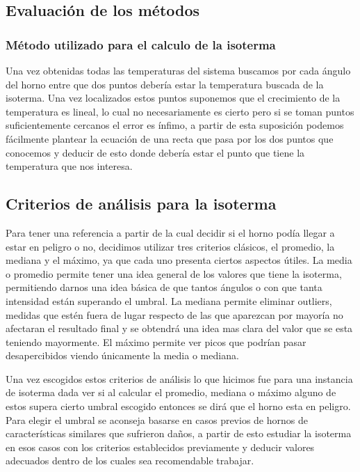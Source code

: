 \subsection{Evaluación de los métodos}

\subsubsection{Método utilizado para el calculo de la isoterma}

Una vez obtenidas todas las temperaturas del sistema buscamos por cada ángulo del horno entre que dos puntos debería estar la temperatura buscada de la isoterma. Una vez localizados estos puntos suponemos que el crecimiento de la temperatura es lineal, lo cual no necesariamente es cierto pero si se toman puntos suficientemente cercanos el error es ínfimo, a partir de esta suposición podemos fácilmente plantear la ecuación de una recta que pasa por los dos puntos que conocemos y deducir de esto donde debería estar el punto que tiene la temperatura que nos interesa.

\subsection{Criterios de análisis para la isoterma}
 Para tener una referencia a partir de la cual decidir si el horno podía llegar a estar en peligro o no, decidimos utilizar tres criterios clásicos, el promedio, la mediana y el máximo, ya que cada uno presenta ciertos aspectos útiles. La media o promedio permite tener una idea general de los valores que tiene la isoterma, permitiendo darnos una idea básica de que tantos ángulos o con que tanta intensidad están superando el umbral. La mediana permite eliminar outliers, medidas que estén fuera de lugar respecto de las que aparezcan por mayoría no afectaran el resultado final y se obtendrá una idea mas clara del valor que se esta teniendo mayormente. El máximo permite ver picos que podrían pasar desapercibidos viendo únicamente la media o mediana.

Una vez escogidos estos criterios de análisis lo que hicimos fue para una instancia de isoterma dada ver si al calcular el promedio, mediana o máximo alguno de estos supera cierto umbral escogido entonces se dirá que el horno esta en peligro. Para elegir el umbral se aconseja basarse en casos previos de hornos de características similares que sufrieron daños, a partir de esto estudiar la isoterma en esos casos con los criterios establecidos previamente y deducir valores adecuados dentro de los cuales sea recomendable trabajar.

